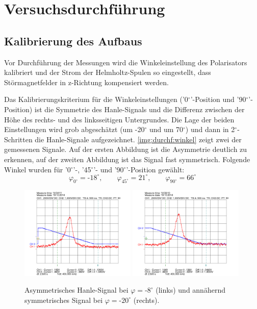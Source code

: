 \section{Versuchsdurchführung}

\subsection{Kalibrierung des Aufbaus}
\label{sub:calibration}

Vor Durchführung der Messungen wird die Winkeleinstellung des Polarisators kalibriert
und der Strom der Helmholtz-Spulen so eingestellt,
dass Störmagnetfelder in z-Richtung kompensiert werden.

Das Kalibrierungskriterium für die Winkeleinstellungen ('0$^\circ$'-Position und '90$^\circ$'-Position)
ist die Symmetrie des Hanle-Signals und die Differenz zwischen
der Höhe des rechts- und des linksseitigen Untergrundes.
Die Lage der beiden Einstellungen wird grob abgeschätzt (um -20$^\circ$ und um 70$^\circ$)
und dann in 2$^\circ$-Schritten die Hanle-Signale aufgezeichnet.
\autoref{img:durchf:winkel} zeigt zwei der gemessenen
Signale. Auf der ersten Abbildung ist die Asymmetrie deutlich zu erkennen,
auf der zweiten Abbildung ist das Signal fast symmetrisch.
Folgende Winkel wurden für '0$^\circ$'-, '45$^\circ$'- und '90$^\circ$'-Position gewählt:
\begin{equation}
\label{eq:calang}
 \varphi_{0^\circ}=\text{-}18^\circ, \qquad \varphi_{45^\circ}=21^\circ, \qquad \varphi_{90^\circ}=66^\circ
\end{equation}
\begin{figure}[H]
\begin{center}
  \includegraphics[width=0.49\textwidth]{../data/1/-7_5.png}
  \includegraphics[width=0.49\textwidth]{../data/1/-20.png}
  \caption{Asymmetrisches Hanle-Signal bei $\varphi=\text{-}8^\circ$ (links) und
  annähernd symmetrisches Signal bei $\varphi=\text{-}20^\circ$ (rechts).}
  \label{img:durchf:winkel}
\end{center}
\end{figure}
